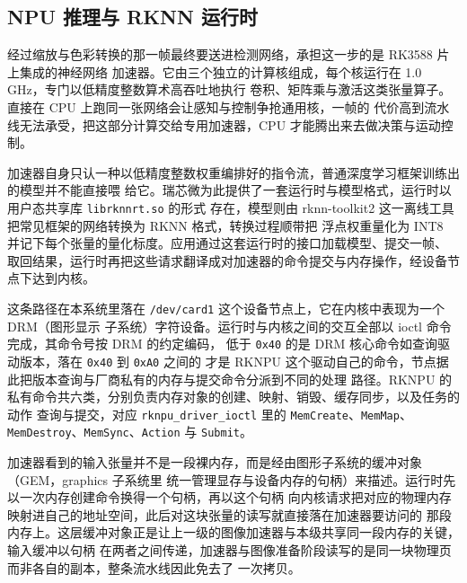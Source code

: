 \subsection{NPU 推理与 RKNN 运行时}\label{sec:npu}

经过缩放与色彩转换的那一帧最终要送进检测网络，承担这一步的是 RK3588 片上集成的神经网络
加速器。它由三个独立的计算核组成，每个核运行在 1.0\,GHz，专门以低精度整数算术高吞吐地执行
卷积、矩阵乘与激活这类张量算子。直接在 CPU 上跑同一张网络会让感知与控制争抢通用核，一帧的
代价高到流水线无法承受，把这部分计算交给专用加速器，CPU 才能腾出来去做决策与运动控制。

加速器自身只认一种以低精度整数权重编排好的指令流，普通深度学习框架训练出的模型并不能直接喂
给它。瑞芯微为此提供了一套运行时与模型格式，运行时以用户态共享库 \texttt{librknnrt.so} 的形式
存在，模型则由 rknn-toolkit2 这一离线工具把常见框架的网络转换为 RKNN 格式，转换过程顺带把
浮点权重量化为 INT8 并记下每个张量的量化标度。应用通过这套运行时的接口加载模型、提交一帧、
取回结果，运行时再把这些请求翻译成对加速器的命令提交与内存操作，经设备节点下达到内核。

这条路径在本系统里落在 \texttt{/dev/card1} 这个设备节点上，它在内核中表现为一个 DRM（图形显示
子系统）字符设备。运行时与内核之间的交互全部以 ioctl 命令完成，其命令号按 DRM 的约定编码，
低于 \texttt{0x40} 的是 DRM 核心命令如查询驱动版本，落在 \texttt{0x40} 到 \texttt{0xA0} 之间的
才是 RKNPU 这个驱动自己的命令，节点据此把版本查询与厂商私有的内存与提交命令分派到不同的处理
路径。RKNPU 的私有命令共六类，分别负责内存对象的创建、映射、销毁、缓存同步，以及任务的动作
查询与提交，对应 \texttt{rknpu\_driver\_ioctl} 里的 \texttt{MemCreate}、\texttt{MemMap}、
\texttt{MemDestroy}、\texttt{MemSync}、\texttt{Action} 与 \texttt{Submit}。

加速器看到的输入张量并不是一段裸内存，而是经由图形子系统的缓冲对象（GEM，graphics 子系统里
统一管理显存与设备内存的句柄）来描述。运行时先以一次内存创建命令换得一个句柄，再以这个句柄
向内核请求把对应的物理内存映射进自己的地址空间，此后对这块张量的读写就直接落在加速器要访问的
那段内存上。这层缓冲对象正是让上一级的图像加速器与本级共享同一段内存的关键，输入缓冲以句柄
在两者之间传递，加速器与图像准备阶段读写的是同一块物理页而非各自的副本，整条流水线因此免去了
一次拷贝。

